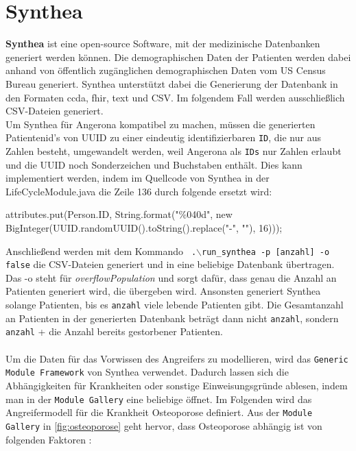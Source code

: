 \documentclass[german,version-2020-11]{uzl-thesis}
\begin{document}
\section{Synthea}
\textbf{Synthea} \cite{19,20} ist eine open-source Software, mit der medizinische Datenbanken generiert werden können. Die demographischen Daten der Patienten werden dabei anhand von öffentlich zugänglichen demographischen Daten vom US Census Bureau \cite{21} generiert. Synthea unterstützt dabei die Generierung der Datenbank in den Formaten ccda, fhir, text und CSV. Im folgendem Fall werden ausschließlich CSV-Dateien generiert.\\  Um Synthea für Angerona kompatibel zu machen, müssen die generierten Patientenid's von UUID zu einer eindeutig identifizierbaren \texttt{ID}, die nur aus Zahlen besteht, umgewandelt werden, weil Angerona als \texttt{IDs} nur Zahlen erlaubt und die UUID noch Sonderzeichen und Buchstaben enthält. Dies kann implementiert werden, indem im Quellcode von Synthea in der LifeCycleModule.java die Zeile 136 durch folgende ersetzt wird:
\begin{Java}
attributes.put(Person.ID, String.format("\%040d", new BigInteger(UUID.randomUUID().toString().replace("-", ""), 16)));
\end{Java}
Anschließend werden mit dem Kommando \texttt{ .$\backslash$run\_synthea -p [anzahl] -o false} die CSV-Dateien generiert und in eine beliebige Datenbank übertragen. Das -o steht für \textit{\textit{overflowPopulation}} und sorgt dafür, dass genau die Anzahl an Patienten generiert wird, die übergeben wird. Ansonsten generiert Synthea solange Patienten, bis es \texttt{anzahl} viele lebende Patienten gibt. Die Gesamtanzahl an Patienten in der generierten Datenbank beträgt dann nicht \texttt{anzahl}, sondern \texttt{anzahl} + die Anzahl bereits gestorbener Patienten. \\ \\
Um die Daten für das Vorwissen des Angreifers zu modellieren, wird das \texttt{Generic Module Framework} von Synthea verwendet. Dadurch lassen sich die Abhängigkeiten für Krankheiten oder sonstige  Einweisungsgründe ablesen, indem man in der \texttt{Module Gallery} \cite{25} eine beliebige öffnet. Im Folgenden  wird das Angreifermodell für die Krankheit Osteoporose definiert. 
Aus der \texttt{Module Gallery} in \autoref{fig:osteoporose} geht hervor, dass Osteoporose abhängig ist von folgenden Faktoren : 
\end{document}

